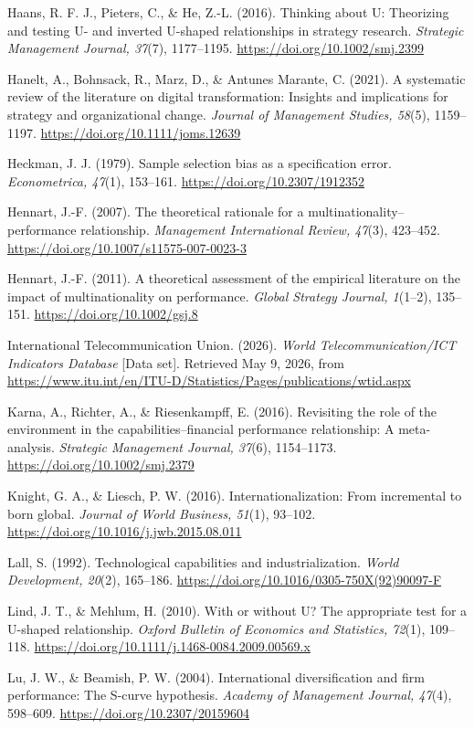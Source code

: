 \documentclass[12pt,a4paper]{article}
\begin{document}
Haans, R. F. J., Pieters, C., \& He, Z.-L. (2016). Thinking about U:
Theorizing and testing U- and inverted U-shaped relationships in
strategy research. \emph{Strategic Management Journal, 37}(7),
1177--1195. \url{https://doi.org/10.1002/smj.2399}

Hanelt, A., Bohnsack, R., Marz, D., \& Antunes Marante, C. (2021). A
systematic review of the literature on digital transformation: Insights
and implications for strategy and organizational change. \emph{Journal
of Management Studies, 58}(5), 1159--1197.
\url{https://doi.org/10.1111/joms.12639}

Heckman, J. J. (1979). Sample selection bias as a specification error.
\emph{Econometrica, 47}(1), 153--161.
\url{https://doi.org/10.2307/1912352}

Hennart, J.-F. (2007). The theoretical rationale for a
multinationality--performance relationship. \emph{Management
International Review, 47}(3), 423--452.
\url{https://doi.org/10.1007/s11575-007-0023-3}

Hennart, J.-F. (2011). A theoretical assessment of the empirical
literature on the impact of multinationality on performance.
\emph{Global Strategy Journal, 1}(1--2), 135--151.
\url{https://doi.org/10.1002/gsj.8}

International Telecommunication Union. (2026). \emph{World
Telecommunication/ICT Indicators Database} {[}Data set{]}. Retrieved May
9, 2026, from
\url{https://www.itu.int/en/ITU-D/Statistics/Pages/publications/wtid.aspx}

Karna, A., Richter, A., \& Riesenkampff, E. (2016). Revisiting the role
of the environment in the capabilities--financial performance
relationship: A meta-analysis. \emph{Strategic Management Journal,
37}(6), 1154--1173. \url{https://doi.org/10.1002/smj.2379}

Knight, G. A., \& Liesch, P. W. (2016). Internationalization: From
incremental to born global. \emph{Journal of World Business, 51}(1),
93--102. \url{https://doi.org/10.1016/j.jwb.2015.08.011}

Lall, S. (1992). Technological capabilities and industrialization.
\emph{World Development, 20}(2), 165--186.
\url{https://doi.org/10.1016/0305-750X(92)90097-F}

Lind, J. T., \& Mehlum, H. (2010). With or without U? The appropriate
test for a U-shaped relationship. \emph{Oxford Bulletin of Economics and
Statistics, 72}(1), 109--118.
\url{https://doi.org/10.1111/j.1468-0084.2009.00569.x}

Lu, J. W., \& Beamish, P. W. (2004). International diversification and
firm performance: The S-curve hypothesis. \emph{Academy of Management
Journal, 47}(4), 598--609. \url{https://doi.org/10.2307/20159604}
\end{document}
